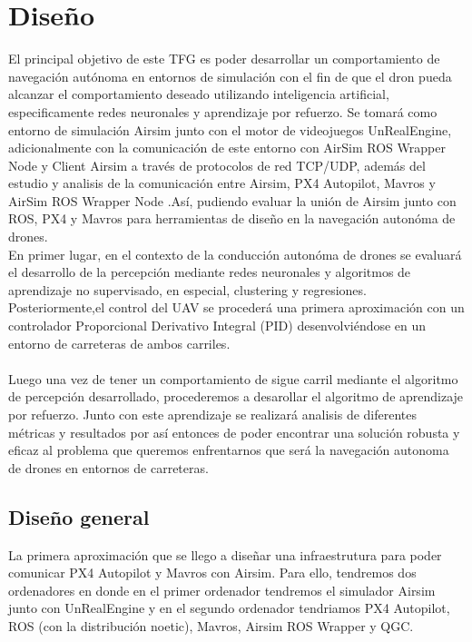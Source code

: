 \chapter{Diseño}
\label{cap:capitulo4}


\vspace{1cm}
El principal objetivo de este TFG es poder desarrollar un comportamiento de navegación autónoma en entornos de simulación 
con el fin de que el dron pueda alcanzar el comportamiento deseado utilizando inteligencia artificial, especificamente redes neuronales
y aprendizaje por refuerzo. Se tomará como entorno de simulación Airsim junto con el motor de videojuegos UnRealEngine, adicionalmente con 
la comunicación de este entorno con AirSim ROS Wrapper Node y Client Airsim a través de protocolos de red TCP/UDP, además del estudio y 
analisis de la comunicación entre Airsim, PX4 Autopilot, Mavros y AirSim ROS Wrapper Node .Así, pudiendo evaluar la unión de Airsim junto con ROS, PX4 y Mavros para
herramientas de diseño en la navegación autonóma de drones. \newline
\\

En primer lugar, en el contexto de la conducción autonóma de drones se evaluará el desarrollo de la percepción mediante redes neuronales y algoritmos de
aprendizaje no supervisado, en especial, clustering y regresiones. 
Posteriormente,el control del UAV se procederá una primera aproximación con un controlador Proporcional Derivativo Integral (PID) desenvolviéndose
en un entorno de carreteras de ambos carriles. \\
\\

Luego una vez de tener un comportamiento de sigue carril mediante el algoritmo de percepción desarrollado, procederemos a desarollar el algoritmo de 
aprendizaje por refuerzo. Junto con este aprendizaje se realizará analisis de diferentes métricas y resultados
por así entonces de poder encontrar una solución robusta y eficaz al problema que queremos enfrentarnos que será la navegación autonoma de drones en
entornos de carreteras.


\section{Diseño general}
\label{sec:Diseño general}
La primera aproximación que se llego a diseñar una infraestrutura para poder comunicar PX4 Autopilot y Mavros con Airsim. Para ello, tendremos
dos ordenadores en donde en el primer ordenador tendremos el simulador Airsim junto con UnRealEngine y en el segundo ordenador tendriamos 
PX4 Autopilot, ROS (con la distribución noetic), Mavros, Airsim ROS Wrapper y QGC. 


